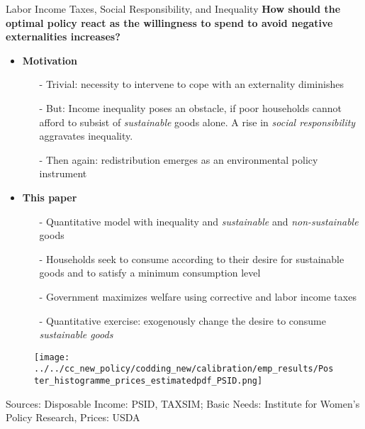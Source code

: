 \begin{frame}{Labor Income Taxes, Social Responsibility, and Inequality}
\footnotesize
	\alert{\textbf{How should the optimal policy react as the willingness to spend to avoid negative externalities increases?}}
	\pause
	\begin{itemize}[<+->]
		\item \textbf{Motivation}
		{\footnotesize
		\begin{itemize}			
			\item[-] Trivial: necessity to intervene to cope with an externality diminishes
			\item[-] But: Income inequality poses an obstacle, if poor households cannot afford to subsist of \textit{sustainable} goods alone. A rise in \textit{social responsibility} aggravates inequality. 
			\item[-] Then again: redistribution emerges as an environmental policy instrument
		\end{itemize}}
	\vspace{2mm}
	\item \textbf{This paper}
	\begin{itemize}
\item[-] Quantitative model with inequality and  \textit{sustainable} and \textit{non-sustainable} goods
\item[-] Households seek to consume according to their desire for sustainable goods and to satisfy a minimum consumption level
\item[-] Government maximizes welfare using corrective and labor income taxes
\item[-] Quantitative exercise: exogenously change the desire to consume \textit{sustainable goods}
	\end{itemize}
	\end{itemize}
\end{frame}

\begin{frame}{}
\vspace{4mm}
\begin{minipage}[]{1\textwidth}
	\begin{figure}
		\texttt{[image: ../../cc\_new\_policy/codding\_new/calibration/emp\_results/Poster\_histogramme\_prices\_estimatedpdf\_PSID.png]}	
	\end{figure}
	\centering
	\tiny{Sources: Disposable Income: PSID, TAXSIM; Basic Needs: Institute for Women's Policy Research, Prices: USDA}
\end{minipage}\end{frame}



